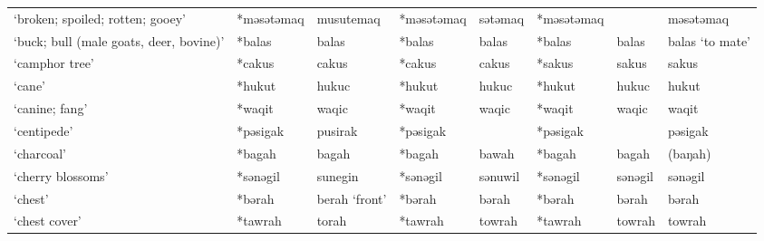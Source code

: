\begin{landscape}
\begin{longtable}[c]{@{}p{3cm}<{\raggedright}p{2.75cm}<{\raggedright}p{2.75cm}<{\raggedright}p{2.75cm}<{\raggedright}p{2.75cm}<{\raggedright}p{2.75cm}<{\raggedright}p{2.75cm}<{\raggedright}p{2.75cm}<{\raggedright}@{}}
`broken; spoiled; rotten; gooey'                     & *məsətəmaq         & musutemaq                      & *məsətəmaq         & sətəmaq                    & *məsətəmaq       &                          & məsətəmaq                         \\
`buck; bull (male goats, deer, bovine)'              & *balas             & balas                          & *balas             & balas                      & *balas           & balas                    & balas `to mate'                   \\
`camphor tree'                                       & *cakus             & cakus                          & *cakus             & cakus                      & *sakus           & sakus                    & sakus                             \\
`cane'                                               & *hukut             & hukuc                          & *hukut             & hukuc                      & *hukut           & hukuc                    & hukut                             \\
`canine; fang'                                       & *waqit             & waqic                          & *waqit             & waqic                      & *waqit           & waqic                    & waqit                             \\
`centipede'                                          & *pəsigak           & pusirak                        & *pəsigak           &                            & *pəsigak         &                          & pəsigak                           \\
`charcoal'                                           & *bagah             & bagah                          & *bagah             & bawah                      & *bagah           & bagah                    & (baŋah)                           \\
`cherry blossoms'                                    & *sənəgil           & sunegin                        & *sənəgil           & sənuwil                    & *sənəgil         & sənəgil                  & sənəgil                           \\
`chest'                                              & *bərah             & berah `front'                  & *bərah             & bərah                      & *bərah           & bərah                    & bərah                             \\
`chest cover'                                        & *tawrah            & torah                          & *tawrah            & towrah                     & *tawrah          & towrah                   & towrah                            \\

\end{longtable}
\end{landscape}
